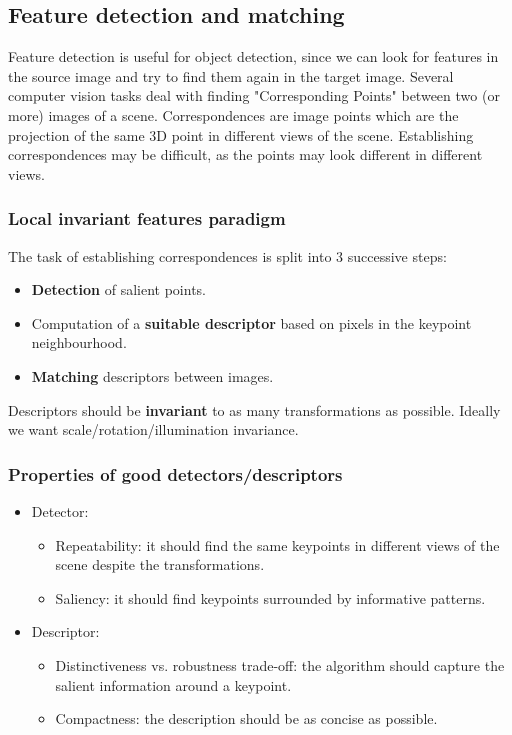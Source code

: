 \subsection{Feature detection and matching}
Feature detection is useful for object detection, since we can look for features in the source image and try to find them again in the target image.
Several computer vision tasks deal with finding "Corresponding Points" between two (or more) images of a scene.
Correspondences are image points which are the projection of the same 3D point in different views of the scene.
Establishing correspondences may be difficult, as the points may look different in different views.

\subsubsection{Local invariant features paradigm}
The task of establishing correspondences is split into 3 successive steps:
\begin{itemize}
  \item \textbf{Detection} of salient points.
  \item Computation of a \textbf{suitable descriptor} based on pixels in the keypoint neighbourhood.
  \item \textbf{Matching} descriptors between images.
\end{itemize}

Descriptors should be \textbf{invariant} to as many transformations as possible.
Ideally we want scale/rotation/illumination invariance.

\subsubsection{Properties of good detectors/descriptors}
\begin{itemize}
  \item Detector:
  \begin{itemize}
    \item Repeatability: it should find the same keypoints in different views of the scene despite the transformations.
    \item Saliency: it should find keypoints surrounded by informative patterns.
  \end{itemize}
  \item Descriptor:
  \begin{itemize}
    \item Distinctiveness vs. robustness trade-off: the algorithm should capture the salient information around a keypoint.
    \item Compactness: the description should be as concise as possible.
  \end{itemize}
\end{itemize}

